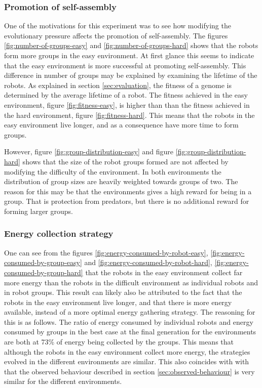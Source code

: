 \subsubsection{Promotion of self-assembly}
One of the motivations for this experiment was to see how modifying the evolutionary pressure affects the promotion of self-assembly.
The figures \ref{fig:number-of-groups-easy} and \ref{fig:number-of-groups-hard} shows that the robots form more groups in the easy environment.
At first glance this seems to indicate that the easy environment is more successful at promoting self-assembly.
This difference in number of groups may be explained by examining the lifetime of the robots.
As explained in section \ref{sec:evaluation}, the fitness of a genome is determined by the average lifetime of a robot.
The fitness achieved in the easy environment, figure \ref{fig:fitness-easy}, is higher than than the fitness achieved in the hard environment, figure \ref{fig:fitness-hard}.
This means that the robots in the easy environment live longer, and as a consequence have more time to form groups.

However, figure \ref{fig:group-distribution-easy} and figure \ref{fig:group-distribution-hard} shows that the size of the robot groups formed are not affected by modifying the difficulty of the environment.
In both environments the distribution of group sizes are heavily weighted towards groups of two.
The reason for this may be that the environments gives a high reward for being in a group.
That is protection from predators, but there is no additional reward for forming larger groups.

\subsubsection{Energy collection strategy}
One can see from the figures \ref{fig:energy-consumed-by-robot-easy}, \ref{fig:energy-consumed-by-group-easy} and \ref{fig:energy-consumed-by-robot-hard}, \ref{fig:energy-consumed-by-group-hard} that the robots in the easy environment collect far more energy than the robots in the difficult environment as individual robots and in robot groups.
This result can likely also be attributed to the fact that the robots in the easy environment live longer, and that there is more energy available, instead of a more optimal energy gathering strategy.
The reasoning for this is as follows.
The ratio of energy consumed by individual robots and energy consumed by groups in the best case at the final generation for the environments are both at 73\% of energy being collected by the groups.
This means that although the robots in the easy environment collect more energy, the strategies evolved in the different environments are similar.
This also coincides with with that the observed behaviour described in section \ref{sec:observed-behaviour} is very similar for the different environments.

